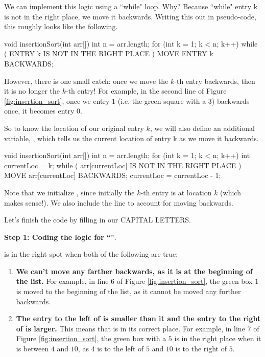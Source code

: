 We can implement this logic using a ``while" loop. Why? Because ``while" entry k is not in the right place, we move it backwards. Writing this out in pseudo-code, this roughly looks like the following.
 
\begin{code}
void insertionSort(int arr[]) 
{
    int n = arr.length;
    for (int k = 1; k < n; k++) 
    {
        while ( ENTRY k IS NOT IN THE RIGHT PLACE ) 
        {
            MOVE ENTRY k BACKWARDS;
        }
    }
}
\end{code}
 
However, there is one small catch: once we move the $k$-th entry backwards, then it is no longer the $k$-th entry! For example, in the second line of Figure \ref{fig:insertion_sort}, once we entry $1$ (i.e. the green square with a $3$) backwards once, it becomes entry $0$.

So to know the location of our original entry $k$, we will also define an additional variable, , which tells us the current location of entry k as we move it backwards.

 
\begin{code}
void insertionSort(int arr[]) 
{
    int n = arr.length;
    for (int k = 1; k < n; k++) 
    {
        int currentLoc = k;
        while ( arr[currentLoc] IS NOT IN THE RIGHT PLACE ) 
        {
            MOVE arr[currentLoc] BACKWARDS;
            currentLoc = currentLoc - 1;
        }
    }
}
\end{code}

Note that we initialize , since initially the $k$-th entry is at location $k$ (which makes sense!). We also include the line  to account for moving  backwards.

Let's finish the code by filling in our CAPITAL LETTERS. 

\textbf{Step 1: Coding the logic for ``"}. 

 is in the right spot when both of the following are true:

\begin{enumerate}

 \item \textbf{We can't move  any farther backwards, as it is at the beginning of the list.} For example, in line 6 of Figure \ref{fig:insertion_sort}, the green box $1$ is moved to the beginning of the list, as it cannot be moved any further backwards.
    \item \textbf{The entry to the left of  is smaller than it and the entry to the right of  is larger.} This means that  is in its correct place. For example, in line 7 of Figure \ref{fig:insertion_sort}, the green box with a $5$ is in the right place when it is between $4$ and $10$, as $4$ is to the left of $5$ and $10$ is to the right of $5$. 
\end{enumerate}


